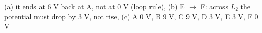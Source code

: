(a) it ends at 6 V back at A, not at 0 V (loop rule), (b) E $\to$ F: across $L_2$ the potential must drop by 3 V, not rise, (c) A 0 V, B 9 V, C 9 V, D 3 V, E 3 V, F 0 V
